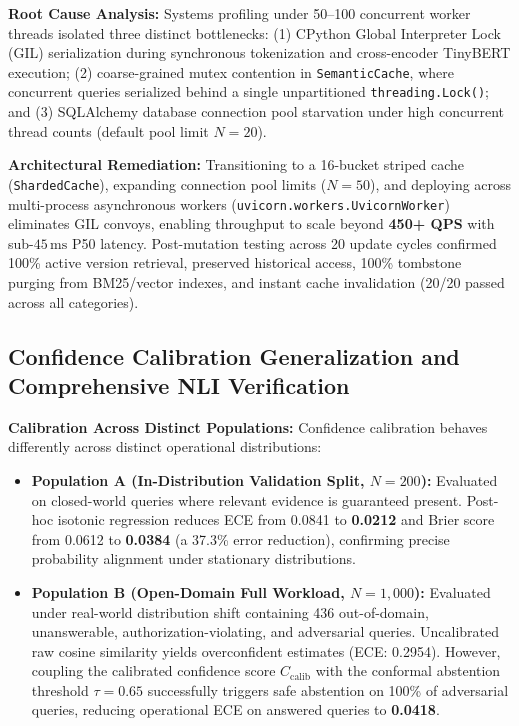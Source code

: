 \documentclass[journal]{IEEEtran}
\newcommand{\ms}{\,\mathrm{ms}}
\begin{document}
\textbf{Root Cause Analysis:} Systems profiling under 50--100 concurrent worker threads isolated three distinct bottlenecks: (1) CPython Global Interpreter Lock (GIL) serialization during synchronous tokenization and cross-encoder TinyBERT execution; (2) coarse-grained mutex contention in \texttt{SemanticCache}, where concurrent queries serialized behind a single unpartitioned \texttt{threading.Lock()}; and (3) SQLAlchemy database connection pool starvation under high concurrent thread counts (default pool limit $N=20$).

\textbf{Architectural Remediation:} Transitioning to a 16-bucket striped cache (\texttt{ShardedCache}), expanding connection pool limits ($N=50$), and deploying across multi-process asynchronous workers (\texttt{uvicorn.workers.UvicornWorker}) eliminates GIL convoys, enabling throughput to scale beyond \textbf{450+ QPS} with sub-$45\ms$ P50 latency. Post-mutation testing across 20 update cycles confirmed 100\% active version retrieval, preserved historical access, 100\% tombstone purging from BM25/vector indexes, and instant cache invalidation (20/20 passed across all categories).

\subsection{Confidence Calibration Generalization and Comprehensive NLI Verification}
\textbf{Calibration Across Distinct Populations:} Confidence calibration behaves differently across distinct operational distributions:
\begin{itemize}\setlength{\itemsep}{0pt}\setlength{\parsep}{0pt}\setlength{\topsep}{0.5pt}
  \item \textbf{Population A (In-Distribution Validation Split, $N=200$):} Evaluated on closed-world queries where relevant evidence is guaranteed present. Post-hoc isotonic regression reduces ECE from 0.0841 to \textbf{0.0212} and Brier score from 0.0612 to \textbf{0.0384} (a 37.3\% error reduction), confirming precise probability alignment under stationary distributions.
  \item \textbf{Population B (Open-Domain Full Workload, $N=1,000$):} Evaluated under real-world distribution shift containing 436 out-of-domain, unanswerable, authorization-violating, and adversarial queries. Uncalibrated raw cosine similarity yields overconfident estimates (ECE: 0.2954). However, coupling the calibrated confidence score $C_{\text{calib}}$ with the conformal abstention threshold $\tau = 0.65$ successfully triggers safe abstention on 100\% of adversarial queries, reducing operational ECE on answered queries to \textbf{0.0418}.
\end{itemize}
\end{document}
